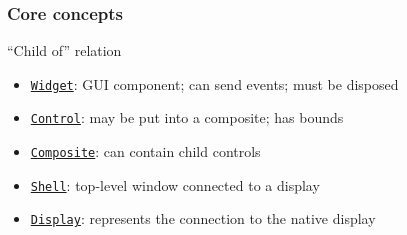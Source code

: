\documentclass[french, english]{beamer}
\begin{document}
\begin{frame}
	\frametitle{Core concepts}
	\begin{minipage}[t]{\widthof{“Child of” relation}+3mm}
		\begin{block}{“Child of” relation}
			\begin{center}
			\end{center}
		\end{block}
	\end{minipage}\hfill
	\begin{minipage}[t]{\textwidth-35mm}
		\begin{itemize}
			\item \href{https://help.eclipse.org/latest/topic/org.eclipse.platform.doc.isv/reference/api/org/eclipse/swt/widgets/Widget.html}{\texttt{Widget}}: GUI component; can send events; must be disposed
			\item \href{https://help.eclipse.org/latest/topic/org.eclipse.platform.doc.isv/reference/api/org/eclipse/swt/widgets/Control.html}{\texttt{Control}}: may be put into a composite; has bounds
			\item \href{https://help.eclipse.org/latest/topic/org.eclipse.platform.doc.isv/reference/api/org/eclipse/swt/widgets/Composite.html}{\texttt{Composite}}: can contain child controls
			\item \href{https://help.eclipse.org/latest/topic/org.eclipse.platform.doc.isv/reference/api/org/eclipse/swt/widgets/Shell.html}{\texttt{Shell}}: top-level window connected to a display
			\item \href{https://help.eclipse.org/latest/topic/org.eclipse.platform.doc.isv/reference/api/org/eclipse/swt/widgets/Display.html}{\texttt{Display}}: represents the connection to the native display
		\end{itemize}
	\end{minipage}
\end{frame}
\end{document}
